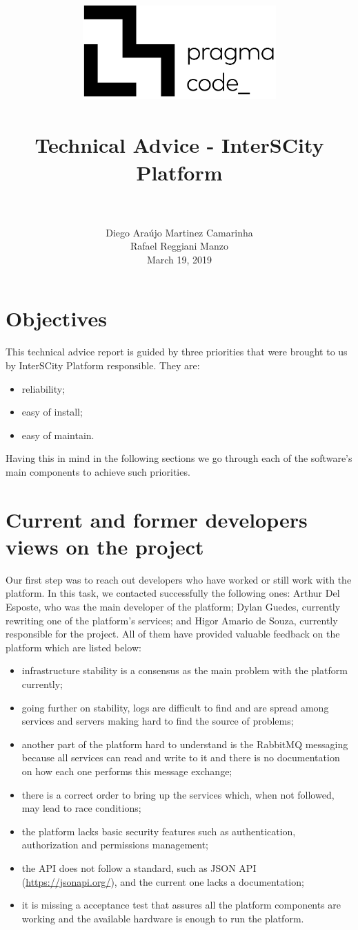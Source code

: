 \documentclass[paper=a4, fontsize=11pt]{scrartcl}
\title{
  \usefont{OT1}{bch}{b}{n}
  \normalfont \normalsize \includegraphics[width=10em]{pc_h_preto} \\ [25pt]
  \horrule{0.5pt} \\[0.4cm]
  \huge Technical Advice - InterSCity Platform \\
  \horrule{2pt} \\[0.5cm]
}
\author{
  \normalfont \normalsize
  Diego Araújo Martinez Camarinha\\[-3pt]    \normalsize
  Rafael Reggiani Manzo\\[-3pt]    \normalsize
  March 19, 2019
}
\date{}
\numberwithin{equation}{section}    %
\numberwithin{figure}{section}      %
\numberwithin{table}{section}        %
\begin{document}
\maketitle

\section{Objectives}
  This technical advice report is guided by three priorities that were brought to us by InterSCity Platform responsible. They are:

  \begin{itemize}
    \item reliability;
    \item easy of install;
    \item easy of maintain.
  \end{itemize}

  Having this in mind in the following sections we go through each of the software's main components to achieve such priorities.

\section{Current and former developers views on the project}
\label{sec:developers}
  Our first step was to reach out developers who have worked or still work with the platform. In this task, we contacted successfully the following ones: Arthur Del Esposte, who was the main developer of the platform; Dylan Guedes, currently rewriting one of the platform's services; and Higor Amario de Souza, currently responsible for the project. All of them have provided valuable feedback on the platform which are listed below:

  \begin{itemize}
    \item infrastructure stability is a consensus as the main problem with the platform currently;
    \item going further on stability, logs are difficult to find and are spread among services and servers making hard to find the source of problems;
    \item another part of the platform hard to understand is the RabbitMQ messaging because all services can read and write to it and there is no documentation on how each one performs this message exchange;
    \item there is a correct order to bring up the services which, when not followed, may lead to race conditions;
    \item the platform lacks basic security features such as authentication, authorization and permissions management;
    \item the API does not follow a standard, such as JSON API (\url{https://jsonapi.org/}), and the current one lacks a documentation;
    \item it is missing a acceptance test that assures all the platform components are working and the available hardware is enough to run the platform.
  \end{itemize}
\end{document}
